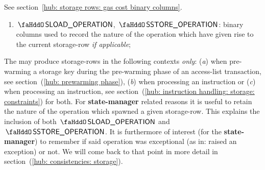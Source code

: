 See section~\ref{hub: storage rows: gas cost binary columns}.
\begin{enumerate}[resume]
	\item
		$\stoSloadOperation$,
		$\stoSstoreOperation$:
		binary columns used to record the nature of the operation which have given rise to the current storage-row \emph{if applicable};
\end{enumerate}
\saNote{} \label{hub: storage rows: metadata for the state manager}
The \zkEvm{} may produce storage-rows in the following contexts \emph{only}:
(\emph{a}) when pre-warming a storage key during the pre-warming phase of an access-list transaction, see section~(\ref{hub: prewarming phase}),
(\emph{b}) when processing an  instruction or
(\emph{c}) when processing an  instruction, see section~(\ref{hub: instruction handling: storage: constraints}) for both.
For \textbf{state-manager} related reasons it is useful to retain the nature of the operation which spawned a given storage-row.
This explains the inclusion of both $\stoSloadOperation$ and $\stoSstoreOperation$.
It is furthermore of interest (for the \textbf{state-manager}) to remember if said operation was exceptional (as in: raised an \evm{} exception) or not.
We will come back to that point in more detail in section~(\ref{hub: consistencies: storage}).
